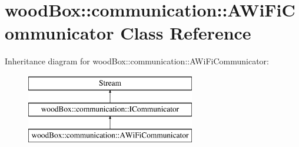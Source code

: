 \hypertarget{classwood_box_1_1communication_1_1_a_wi_fi_communicator}{}\section{wood\+Box\+:\+:communication\+:\+:A\+Wi\+Fi\+Communicator Class Reference}
\label{classwood_box_1_1communication_1_1_a_wi_fi_communicator}
Inheritance diagram for wood\+Box\+:\+:communication\+:\+:A\+Wi\+Fi\+Communicator\+:\begin{figure}[H]
\begin{center}
\leavevmode
\includegraphics[height=3.000000cm]{classwood_box_1_1communication_1_1_a_wi_fi_communicator}
\end{center}
\end{figure}

